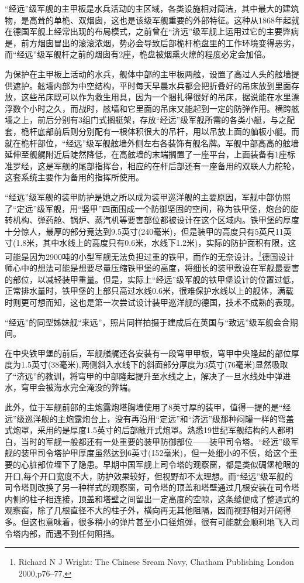 \documentclass[12pt,UTF8]{ctexbook}
\begin{document}
“经远”级军舰的主甲板是水兵活动的主区域，各类设施相对简洁，其中最大的建筑物，是高耸的单桅、双烟囱，这也是该级军舰重要的外部特征。这种从1868年起就在德国军舰上经常出现的布局模式，之前曾在“济远”级军舰上运用过它的主要弊病是，前方烟囱冒出的滚滚浓烟，势必会导致后部桅杆桅盘里的工作环境变得恶劣，而“经远”级军舰杆之前的烟囱有2座，桅盘被烟熏火燎的程度必定会加倍。

为保护在主甲板上活动的水兵，舰体中部的主甲板两舷，设置了高过人头的舷墙提供遮护。舷墙内部为中空结构，平时每天早晨水兵都会把折叠好的吊床放到里面存放，这些吊床既可以作为救生用具，因为一个捆扎得很好的吊床，据说能在水里漂浮数个小时之久，而战时，舷墙和它里面的吊床又能起到一定的防弹作用。横跨舷墙之上，前后分别有3组门式搁艇架，存放“经远”级军舰所需的各类小艇，与之配套，桅杆底部前后则分别配有一根体积很大的吊杆，用以吊放上面的舢板小艇。而就在桅杆部位，“经远”级军舰舷墙外侧左右各装饰有舰名牌。军舰中部高高的舷墙延伸至舰艉附近后陡然降低，在高舷墙的末端搁置了一座平台，上面装备有1座标准罗经，这是军舰的尾部指挥台，相应的在杆后部还有一座备用的双联人力舵轮，这套系统主要作为备用的指挥所使用。

“经远”级军舰的装甲防护是她之所以成为装甲巡洋舰的主要原因，军舰中部仿照了“定远”级军舰，用“竖甲”四面围成一个防御坚固的空间，称为铁甲堡，炮台的旋转机构、弹药舱、锅炉、蒸汽机等要害部位都被设计在这个区域内。铁甲堡的厚度十分惊人，最厚的部分竟达到9.5英寸(240毫米)，但是装甲的高度只有5英尺11英寸(1.8米，其中水线上的高度只有0.6米，水线下1.2米)，实际的防护面积有限，这可能是因为2900吨的小型军舰无法负担过重的铁甲，而作的无奈设计。\footnote{Richard N J Wright: The Chinese Sream Navy, Chatham Publishing London 2000,p76--77.}德国设计师心中的想法可能是想要尽量压缩铁甲堡的高度，将细长的装甲敷设在军舰最要害的部位，以减轻装甲重量。但是，实际上“经远”级军舰的铁甲堡设计的位置过低，正常排水量时，铁甲堡的上部只高过水线0.6米，很难保护水线以上的舰体，满载时则更可想而知，这也是第一次尝试设计装甲巡洋舰的德国，技术不成熟的表现。

“经远”的同型姊妹舰“来远”，照片同样拍摄于建成后在英国与“致远”级军舰会合期间。

在中央铁甲堡的前后，军舰艏艉还各安装有一段穹甲甲板，穹甲中央隆起的部位厚度为1.5英寸(38毫米),两侧斜入水线下的斜面部分厚度为3英寸(76毫米)显然吸取了“济远”的教训，将穹甲的中部隆起提升至水线之上，解决了一旦水线处中弹进水，穹甲会被海水完全淹没的弊端。

此外，位于军舰前部的主炮露炮塔胸墙使用了8英寸厚的装甲，值得一提的是“经远”级巡洋舰的主炮露炮台上，没有再沿用“定远”和“济远”级那种闷罐一样的穹盖式炮罩，采用的是厚度1.5英寸的后部敞开式炮罩。熟悉19世纪军舰结构的人都明白，当时的军舰一般都还有一处重要的装甲防御部位——装甲司令塔。“经远”级军舰的装甲司令塔护甲厚度虽然达到6英寸(152毫米)，但一处细小的不慎，给这个重要的心脏部位埋下了隐患。早期中国军舰上司令塔的观察窗，都是类似碉堡枪眼的开口,每个开口宽度不大，防护效果较好，但视野却不太理想。而“经远”级军舰的司令塔则改换了另一种样式的观察窗，司令塔的顶盖和塔壁通过几根安装在司令塔内侧的柱子相连接，顶盖和塔壁之间留出一定高度的空隙，这条缝便成了整通式的观察窗，除了几根直径不大的柱子外，横向再无其他阻隔，因而视野相对开阔得多。但这也意味着，很多稍小的弹片甚至小口径炮弹，很有可能就会顺利地飞入司令塔内部，而遇不到任何阻挡。
\end{document}
